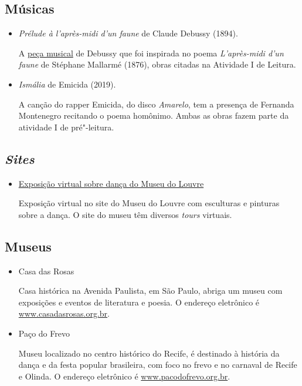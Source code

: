 \documentclass[12pt]{extarticle}
\begin{document}
\subsection{Músicas}

\begin{itemize}

\item \textit{Prélude à l'après-midi
d'un faune} de Claude Debussy (1894).

A \href{https://www.youtube.com/watch?v=bYyK922PsUw}{peça musical} de Debussy que foi inspirada no poema \textit{L'après-midi d'un faune} 
de Stéphane Mallarmé (1876), obras citadas na Atividade I de Leitura.

\item \textit{Ismália} de Emicida (2019).

A canção do rapper Emicida, do disco \emph{Amarelo}, tem a presença de Fernanda Montenegro recitando o poema homônimo. Ambas as obras fazem parte da atividade I de pré"-leitura.

\end{itemize}

\subsection{\emph{Sites}}

\begin{itemize}

\item \href{https://petitegalerie.louvre.fr/visite-virtuelle/saison2/}{Exposição virtual sobre dança do Museu do Louvre}

Exposição virtual no site do Museu do Louvre com esculturas e pinturas sobre a dança. O site do museu têm diversos \textit{tours} virtuais.

\end{itemize}

\subsection{Museus}

\begin{itemize}

\item Casa das Rosas

Casa histórica na Avenida Paulista, em São Paulo, abriga um museu com exposições e eventos de literatura e poesia. O endereço eletrônico é
\url{www.casadasrosas.org.br}.

\item Paço do Frevo

Museu localizado no centro histórico do Recife, é destinado à história da dança e da festa popular brasileira, com foco no frevo e no carnaval de Recife e Olinda. O endereço eletrônico é
\url{www.pacodofrevo.org.br}.

\end{itemize}
\end{document}
